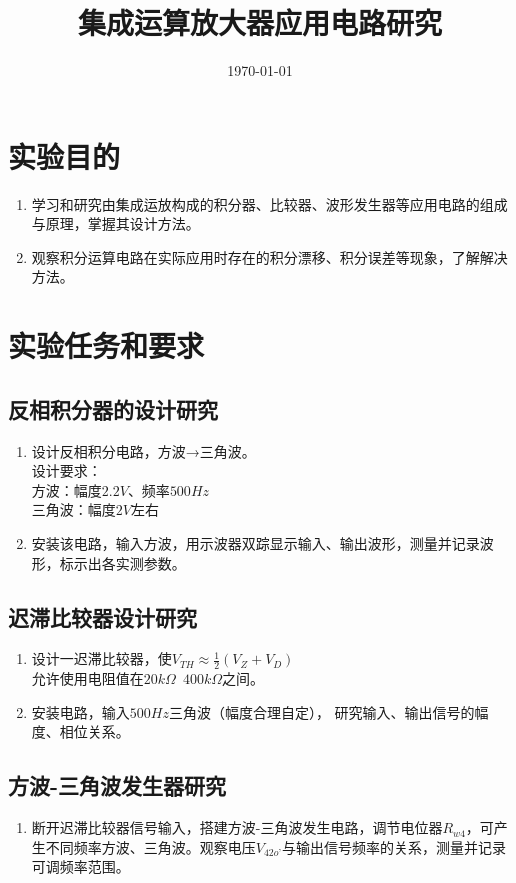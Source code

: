\documentclass{../source/Experiment}
\title{集成运算放大器应用电路研究}
\date{\today}
\begin{document}
    \makecover
    \makeheader

    \section{实验目的}
        \begin{enumerate}
            \item 学习和研究由集成运放构成的积分器、比较器、波形发生器等应用电路的组成与原理，掌握其设计方法。
            \item 观察积分运算电路在实际应用时存在的积分漂移、积分误差等现象，了解解决方法。
        \end{enumerate}
    \section{实验任务和要求}
        \subsection{反相积分器的设计研究}
            \begin{enumerate}
                \item 设计反相积分电路，方波→三角波。\\
                设计要求：\\
                方波：幅度$2.2V$、频率$500Hz$\\
                三角波：幅度$2V$左右
                \item 安装该电路，输入方波，用示波器双踪显示输入、输出波形，测量并记录波形，标示出各实测参数。
            \end{enumerate}
        \subsection{迟滞比较器设计研究}
            \begin{enumerate}
                \item 设计一迟滞比较器，使$V_{TH} \approx \frac{1}{2}(V_Z + V_D)$\\
                允许使用电阻值在$20k\Omega$~$400k\Omega$之间。
                \item 安装电路，输入$500Hz$三角波（幅度合理自定），	研究输入、输出信号的幅度、相位关系。
            \end{enumerate}
        \subsection{方波-三角波发生器研究}
            \begin{enumerate}
                \item 断开迟滞比较器信号输入，搭建方波-三角波发生电路，调节电位器$R_{w4}$，可产生不同频率方波、三角波。观察电压$V_{42o’}$与输出信号频率的关系，测量并记录可调频率范围。
            \end{enumerate}
\end{document}
